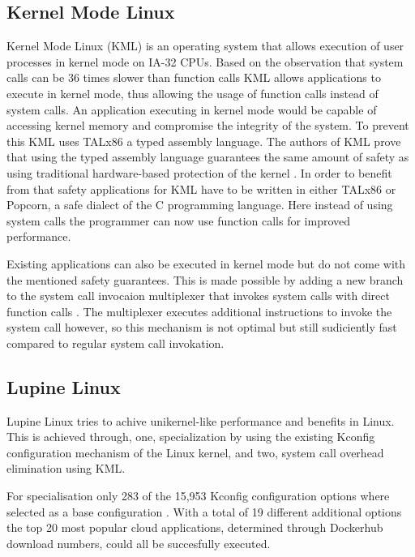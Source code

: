 \documentclass[10pt,twocolumn,a4paper]{article}
\begin{document}
  \subsection{Kernel Mode Linux}
    Kernel Mode Linux (KML) is an operating system that allows
    execution of user processes in kernel mode on IA-32 CPUs.
    Based on the observation that system calls can be 36 times slower
    than function calls \cite{maeda2003} KML allows applications to execute in
    kernel mode, thus allowing the usage of function calls instead of system calls.
    An application executing in kernel mode would be capable of accessing kernel
    memory and compromise the integrity of the system.
    To prevent this KML uses TALx86 a typed assembly language.
    The authors of KML prove that using the typed assembly language guarantees the 
    same amount of safety as using traditional hardware-based protection of the kernel \cite{maeda2003}.
    In order to benefit from that safety applications for KML have to be written in
    either TALx86 or Popcorn, a safe dialect of the C programming language.
    Here instead of using system calls the programmer can now use function calls for improved performance.

    Existing applications can also be executed in kernel mode but do not come with
    the mentioned safety guarantees.
    This is made possible by adding a new branch to the system call invocaion multiplexer
    that invokes system calls with direct function calls \cite{maeda2003}.
    The multiplexer executes additional instructions to invoke the system call however, 
    so this mechanism is not optimal but still sudiciently fast compared to regular system call
    invokation.

  \subsection{Lupine Linux}
    Lupine Linux tries to achive unikernel-like performance and benefits in Linux.
    This is achieved through, one, specialization by using the existing Kconfig 
    configuration mechanism of the Linux kernel, 
    and two, system call overhead elimination using KML.

    For specialisation only 283 of the 15,953 Kconfig configuration options where
    selected as a base configuration \cite{kuo20}.
    With a total of 19 different additional options the top 20 most popular cloud applications,
    determined through Dockerhub download numbers, could all be succesfully executed.
\end{document}
